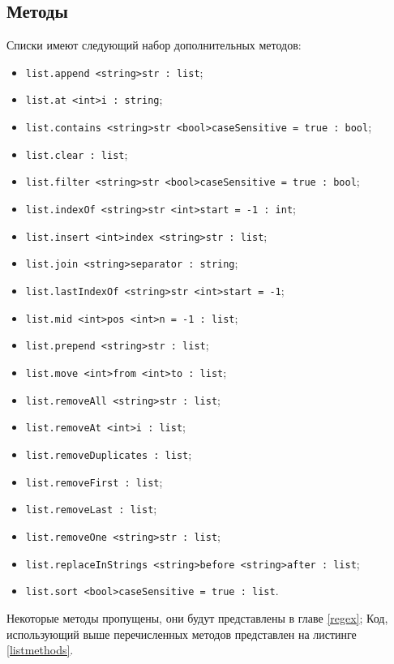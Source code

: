 \documentclass[a4paper, 14pt]{extarticle}
\newenvironment{icItems}
	{ \begin{itemize} [noitemsep,nolistsep] }
	{ \end{itemize} }
\begin{document}
\subsection{Методы}

Списки имеют следующий набор дополнительных методов:
\begin{icItems}
\item \lstinline|list.append <string>str : list|;
\item \lstinline|list.at <int>i : string|;
\item \lstinline|list.contains <string>str <bool>caseSensitive = true : bool|;
\item \lstinline|list.clear : list|;
\item \lstinline|list.filter <string>str <bool>caseSensitive = true : bool|;
\item \lstinline|list.indexOf <string>str <int>start = -1 : int|;
\item \lstinline|list.insert <int>index <string>str : list|;
\item \lstinline|list.join <string>separator : string|;
\item \lstinline|list.lastIndexOf <string>str <int>start = -1|;
\item \lstinline|list.mid <int>pos <int>n = -1 : list|;
\item \lstinline|list.prepend <string>str : list|;
\item \lstinline|list.move <int>from <int>to : list|;
\item \lstinline|list.removeAll <string>str : list|;
\item \lstinline|list.removeAt <int>i : list|;
\item \lstinline|list.removeDuplicates : list|;
\item \lstinline|list.removeFirst : list|;
\item \lstinline|list.removeLast : list|;
\item \lstinline|list.removeOne <string>str : list|;
\item \lstinline|list.replaceInStrings <string>before <string>after : list|;
\item \lstinline|list.sort <bool>caseSensitive = true : list|.
\end{icItems}

Некоторые методы пропущены, они будут представлены в главе \ref{regex}; Код, использующий выше перечисленных методов представлен на листинге \ref{listmethods}. 
\end{document}
